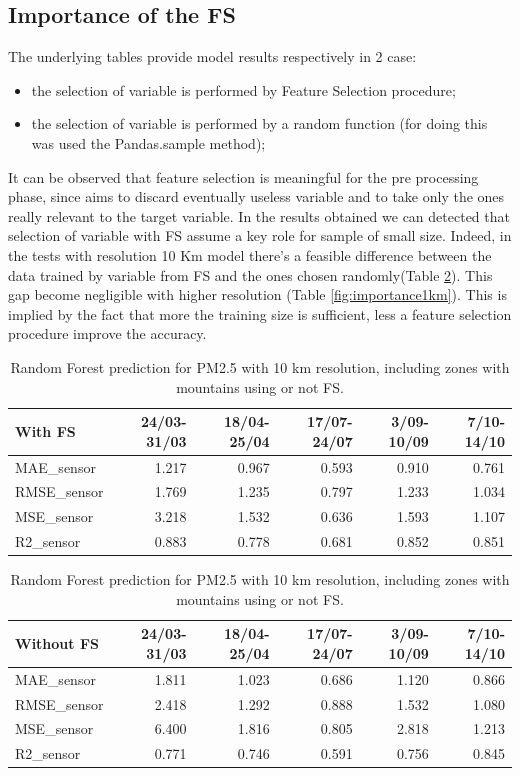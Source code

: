 \subsection{Importance of the FS}
The underlying tables provide model results respectively in 2 case:
\begin{itemize}
    \item the selection of variable is performed by Feature Selection procedure;
    \item the selection of variable is performed by a random function (for doing this was used the Pandas.sample method);
\end{itemize}
It can be observed that feature selection is meaningful for the pre processing phase, since aims to discard eventually useless variable and to take only the ones really relevant to the target variable. In the results obtained we can detected that selection of variable with FS assume a key role for sample of small size. 
Indeed, in the tests with resolution 10 Km model there's a feasible difference between the data trained by variable from FS and the ones chosen randomly(Table \ref{fig:importance10km}). 
This gap become negligible with higher resolution (Table \ref{fig:importance1km}).
This is implied by the fact that more the training size is sufficient, less a feature selection procedure improve the accuracy\cite{chu2012does}.

\begin{table}[H]
\begin{tabular}{lrrrrr}
\toprule
 With FS &  24/03-31/03 &  18/04-25/04 &  17/07-24/07 &  3/09-10/09 &  7/10-14/10 \\
\midrule
 MAE\_sensor &        1.217 &        0.967 &        0.593 &       0.910 &       0.761 \\
RMSE\_sensor &        1.769 &        1.235 &        0.797 &       1.233 &       1.034 \\
 MSE\_sensor &        3.218 &        1.532 &        0.636 &       1.593 &       1.107 \\
  R2\_sensor &        0.883 &        0.778 &        0.681 &       0.852 &       0.851 \\
\bottomrule
\end{tabular}
\begin{tabular}{lrrrrr}
\toprule
Without FS  &  24/03-31/03 &  18/04-25/04 &  17/07-24/07 &  3/09-10/09 &  7/10-14/10 \\
\midrule
 MAE\_sensor &        1.811 &        1.023 &        0.686 &       1.120 &       0.866 \\
RMSE\_sensor &        2.418 &        1.292 &        0.888 &       1.532 &       1.080 \\
 MSE\_sensor &        6.400 &        1.816 &        0.805 &       2.818 &       1.213 \\
  R2\_sensor &        0.771 &        0.746 &        0.591 &       0.756 &       0.845 \\
\bottomrule
\end{tabular}
\caption{Random Forest prediction for PM2.5 with 10 km resolution, including zones with mountains using or not FS.}
\label{fig:importance10km}

\end{table}



